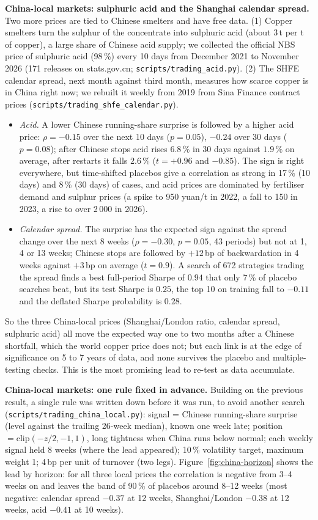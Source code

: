 \documentclass[10pt,a4paper]{article}
\begin{document}
\textbf{China-local markets: sulphuric acid and the Shanghai calendar spread.} Two more prices are tied to Chinese smelters and have free data. (1) Copper smelters turn the sulphur of the concentrate into sulphuric acid (about 3\,t per t of copper), a large share of Chinese acid supply; we collected the official NBS price of sulphuric acid (98\,\%) every 10 days from December 2021 to November 2026 (171 releases on stats.gov.cn; \texttt{scripts/trading\_acid.py}). (2) The SHFE calendar spread, next month against third month, measures how scarce copper is in China right now; we rebuilt it weekly from 2019 from Sina Finance contract prices (\texttt{scripts/trading\_shfe\_calendar.py}).
\begin{itemize}[leftmargin=1.2em]
  \item \emph{Acid.} A lower Chinese running-share surprise is followed by a higher acid price: $\rho=-0.15$ over the next 10 days ($p=0.05$), $-0.24$ over 30 days ($p=0.08$); after Chinese stops acid rises $6.8\,\%$ in 30 days against $1.9\,\%$ on average, after restarts it falls $2.6\,\%$ ($t=+0.96$ and $-0.85$). The sign is right everywhere, but time-shifted placebos give a correlation as strong in 17\,\% (10 days) and 8\,\% (30 days) of cases, and acid prices are dominated by fertiliser demand and sulphur prices (a spike to 950 yuan/t in 2022, a fall to 150 in 2023, a rise to over 2\,000 in 2026).
  \item \emph{Calendar spread.} The surprise has the expected sign against the spread change over the next 8 weeks ($\rho=-0.30$, $p=0.05$, 43 periods) but not at 1, 4 or 13 weeks; Chinese stops are followed by $+12$\,bp of backwardation in 4 weeks against $+3$\,bp on average ($t=0.9$). A search of 672 strategies trading the spread finds a best full-period Sharpe of $0.94$ that only 7\,\% of placebo searches beat, but its test Sharpe is $0.25$, the top 10 on training fall to $-0.11$ and the deflated Sharpe probability is $0.28$.
\end{itemize}
So the three China-local prices (Shanghai/London ratio, calendar spread, sulphuric acid) all move the expected way one to two months after a Chinese shortfall, which the world copper price does not; but each link is at the edge of significance on 5 to 7 years of data, and none survives the placebo and multiple-testing checks. This is the most promising lead to re-test as data accumulate.

\textbf{China-local markets: one rule fixed in advance.} Building on the previous result, a single rule was written down before it was run, to avoid another search (\texttt{scripts/trading\_china\_local.py}): signal = Chinese running-share surprise (level against the trailing 26-week median), known one week late; position $=\mathrm{clip}(-z/2,-1,1)$, long tightness when China runs below normal; each weekly signal held 8 weeks (where the lead appeared); 10\,\% volatility target, maximum weight 1; 4\,bp per unit of turnover (two legs). Figure~\ref{fig:china-horizon} shows the lead by horizon: for all three local prices the correlation is negative from 3--4 weeks on and leaves the band of 90\,\% of placebos around 8--12 weeks (most negative: calendar spread $-0.37$ at 12 weeks, Shanghai/London $-0.38$ at 12 weeks, acid $-0.41$ at 10 weeks).
\end{document}
